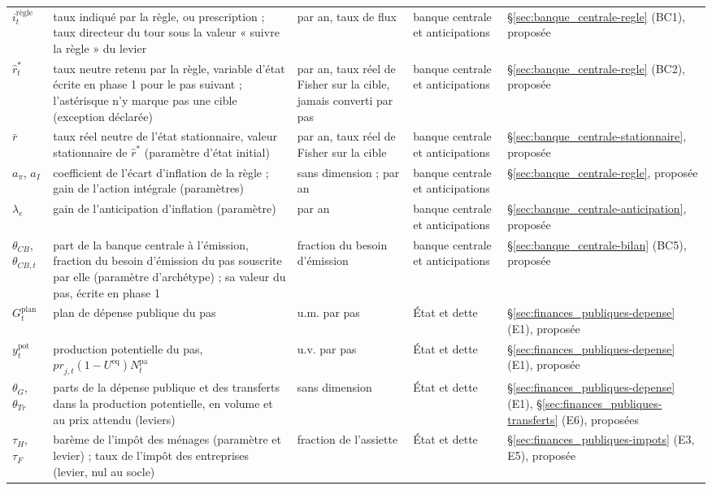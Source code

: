 \documentclass[11pt,a4paper]{article}
\begin{document}
\begin{center}
\begin{longtable}{>{\raggedright\arraybackslash}p{1.6cm}>{\raggedright\arraybackslash}p{5.6cm}>{\raggedright\arraybackslash}p{2.0cm}>{\raggedright\arraybackslash}p{2.2cm}>{\raggedright\arraybackslash}p{2.8cm}}
$i^{\text{règle}}_t$ & taux indiqué par la règle, ou prescription ; taux directeur du tour sous la valeur « suivre la règle » du levier & par an, taux de flux & banque centrale et anticipations & \S\ref{sec:banque_centrale-regle} (BC1), proposée\\
$\hat r^\ast_t$ & taux neutre retenu par la règle, variable d'état écrite en phase 1 pour le pas suivant ; l'astérisque n'y marque pas une cible (exception déclarée) & par an, taux réel de Fisher sur la cible, jamais converti par pas & banque centrale et anticipations & \S\ref{sec:banque_centrale-regle} (BC2), proposée\\
$\bar r$ & taux réel neutre de l'état stationnaire, valeur stationnaire de $\hat r^\ast$ (paramètre d'état initial) & par an, taux réel de Fisher sur la cible & banque centrale et anticipations & \S\ref{sec:banque_centrale-stationnaire}, proposée\\
$a_\pi$, $a_I$ & coefficient de l'écart d'inflation de la règle ; gain de l'action intégrale (paramètres) & sans dimension ; par an & banque centrale et anticipations & \S\ref{sec:banque_centrale-regle}, proposée\\
$\lambda_e$ & gain de l'anticipation d'inflation (paramètre) & par an & banque centrale et anticipations & \S\ref{sec:banque_centrale-anticipation}, proposée\\
$\theta_{\mathit{CB}}$, $\theta_{\mathit{CB},t}$ & part de la banque centrale à l'émission, fraction du besoin d'émission du pas souscrite par elle (paramètre d'archétype) ; sa valeur du pas, écrite en phase 1 & fraction du besoin d'émission & banque centrale et anticipations & \S\ref{sec:banque_centrale-bilan} (BC5), proposée\\
$G^{\mathrm{plan}}_t$ & plan de dépense publique du pas & u.m. par pas & État et dette & \S\ref{sec:finances_publiques-depense} (E1), proposée\\
$y^{\mathrm{pot}}_t$ & production potentielle du pas, $\mathit{pr}_{j,t}(1 - U^{\mathrm{eq}})N^{\mathrm{pa}}_t$ & u.v. par pas & État et dette & \S\ref{sec:finances_publiques-depense} (E1), proposée\\
$\theta_G$, $\theta_{\mathit{Tr}}$ & parts de la dépense publique et des transferts dans la production potentielle, en volume et au prix attendu (leviers) & sans dimension & État et dette & \S\ref{sec:finances_publiques-depense} (E1), \S\ref{sec:finances_publiques-transferts} (E6), proposées\\
$\tau_H$, $\tau_F$ & barème de l'impôt des ménages (paramètre et levier) ; taux de l'impôt des entreprises (levier, nul au socle) & fraction de l'assiette & État et dette & \S\ref{sec:finances_publiques-impots} (E3, E5), proposée\\

\end{longtable}
\end{center}
\end{document}
